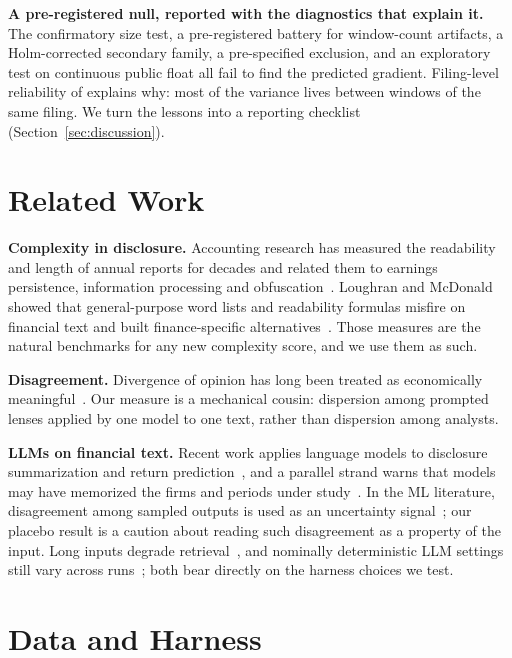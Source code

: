 \documentclass[sigconf,nonacm]{acmart}
\begin{document}
\textbf{A pre-registered null, reported with the diagnostics that explain it.} The
confirmatory size test, a pre-registered battery for window-count artifacts, a
Holm-corrected secondary family, a pre-specified exclusion, and an exploratory test on
continuous public float all fail to find the predicted gradient. Filing-level
reliability of \SplitHalfSB{} explains why: most of the variance lives between windows
of the same filing. We turn the lessons into a reporting checklist
(Section~\ref{sec:discussion}).

\section{Related Work}

\textbf{Complexity in disclosure.} Accounting research has measured the readability
and length of annual reports for decades and related them to earnings persistence,
information processing and obfuscation~\cite{li2008, bgt2018}. Loughran and McDonald
showed that general-purpose word lists and readability formulas misfire on financial
text and built finance-specific alternatives~\cite{lm2011, lm2014, lm2016}. Those
measures are the natural benchmarks for any new complexity score, and we use them as
such.

\textbf{Disagreement.} Divergence of opinion has long been treated as economically
meaningful~\cite{miller1977, dms2002}. Our measure is a mechanical cousin: dispersion
among prompted lenses applied by one model to one text, rather than dispersion among
analysts.

\textbf{LLMs on financial text.} Recent work applies language models to disclosure
summarization and return prediction~\cite{kmn2023, ll2023}, and a parallel strand warns
that models may have memorized the firms and periods under study~\cite{glasserman2023}.
In the ML literature, disagreement among sampled outputs is used as an uncertainty
signal~\cite{wang2023sc, kuhn2023semantic}; our placebo result is a caution about
reading such disagreement as a property of the input. Long inputs degrade
retrieval~\cite{liu2024lost}, and nominally deterministic LLM settings still vary
across runs~\cite{atil2024}; both bear directly on the harness choices we test.

\section{Data and Harness}
\label{sec:data}
\end{document}
